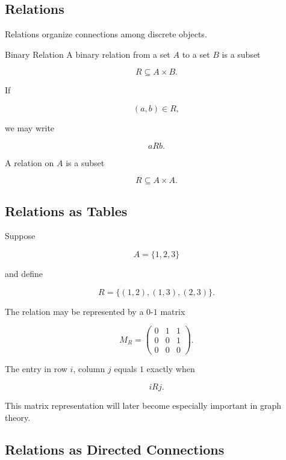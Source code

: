 \subsection{Relations}
\label{subsec:discrete-relations}

Relations organize connections among discrete objects.

\begin{definitionbox}{Binary Relation}
A binary relation from a set \(A\) to a set \(B\) is a subset

\[
\boxed{
R\subseteq A\times B.
}
\]
\end{definitionbox}

If

\[
(a,b)\in R,
\]

we may write

\[
\boxed{
aRb.
}
\]

A relation on \(A\) is a subset

\[
R\subseteq A\times A.
\]

\subsection{Relations as Tables}
\label{subsec:relations-tables}

Suppose

\[
A=\{1,2,3\}
\]

and define

\[
R=\{(1,2),(1,3),(2,3)\}.
\]

The relation may be represented by a \(0\)-\(1\) matrix

\[
M_R
=
\begin{pmatrix}
0&1&1\\
0&0&1\\
0&0&0
\end{pmatrix}.
\]

The entry in row \(i\), column \(j\) equals \(1\) exactly when

\[
iRj.
\]

This matrix representation will later become especially important in
graph theory.

\subsection{Relations as Directed Connections}
\label{subsec:relations-directed}

